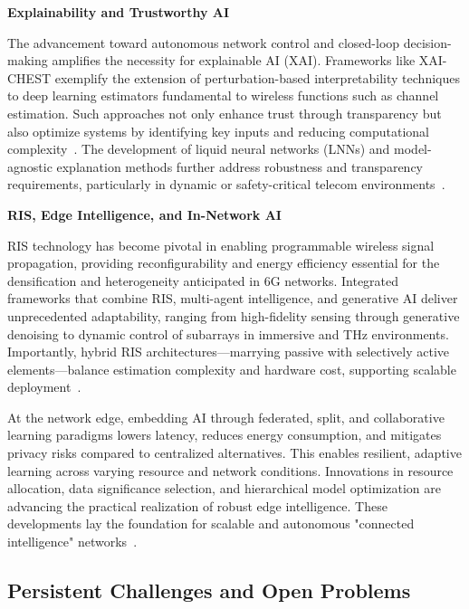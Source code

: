 \textbf{Explainability and Trustworthy AI}

The advancement toward autonomous network control and closed-loop decision-making amplifies the necessity for explainable AI (XAI). Frameworks like XAI-CHEST exemplify the extension of perturbation-based interpretability techniques to deep learning estimators fundamental to wireless functions such as channel estimation. Such approaches not only enhance trust through transparency but also optimize systems by identifying key inputs and reducing computational complexity~\cite{ref43, ref44, ref45, ref46, ref47, ref48, ref49}. The development of liquid neural networks (LNNs) and model-agnostic explanation methods further address robustness and transparency requirements, particularly in dynamic or safety-critical telecom environments~\cite{ref43}.

\textbf{RIS, Edge Intelligence, and In-Network AI}

RIS technology has become pivotal in enabling programmable wireless signal propagation, providing reconfigurability and energy efficiency essential for the densification and heterogeneity anticipated in 6G networks. Integrated frameworks that combine RIS, multi-agent intelligence, and generative AI deliver unprecedented adaptability, ranging from high-fidelity sensing through generative denoising to dynamic control of subarrays in immersive and THz environments. Importantly, hybrid RIS architectures—marrying passive with selectively active elements—balance estimation complexity and hardware cost, supporting scalable deployment~\cite{ref28, ref29, ref30, ref31, ref32, ref33, ref34}.

At the network edge, embedding AI through federated, split, and collaborative learning paradigms lowers latency, reduces energy consumption, and mitigates privacy risks compared to centralized alternatives. This enables resilient, adaptive learning across varying resource and network conditions. Innovations in resource allocation, data significance selection, and hierarchical model optimization are advancing the practical realization of robust edge intelligence. These developments lay the foundation for scalable and autonomous "connected intelligence" networks~\cite{ref35, ref36, ref37, ref38, ref39, ref40, ref41, ref42}.

\subsection{Persistent Challenges and Open Problems}

